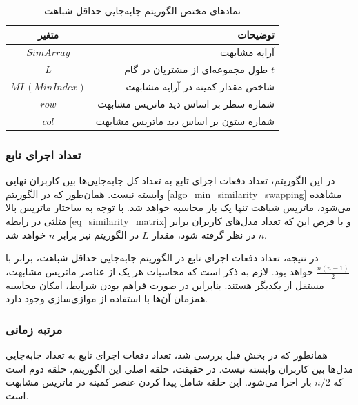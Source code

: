 \begin{table}[h]
	\centering
	\caption{نمادهای مختص الگوریتم جابه‌جایی حداقل شباهت}
	\label{tabel_MinSimilaritySwapNotations}
	\begin{tabular}{cr}
		\hline
		متغیر & توضیحات \\
		\hline
		$SimArray$ & آرایه مشابهت \\
		$L$ & طول مجموعه‌ای از مشتریان در گام $t$ \\
		$MI \, (MinIndex)$ & شاخص مقدار کمینه در آرایه مشابهت \\
		$row$ & شماره سطر بر اساس دید ماتریس مشابهت \\
		$col$ & شماره ستون بر اساس دید ماتریس مشابهت
	\end{tabular}
\end{table}





\vspace{3mm}
\subsubsection{
	تعداد اجرای تابع
}\vspace{-1mm}
در این الگوریتم، تعداد دفعات اجرای تابع
به تعداد کل جابه‌جایی‌ها بین کاربران نهایی وابسته نیست. همان‌طور که در الگوریتم
\ref{algo_min_similarity_swapping}
مشاهده می‌شود، ماتریس شباهت تنها یک بار محاسبه خواهد شد. با توجه به ساختار ماتریس بالا مثلثی در رابطه
\ref{eq_similarity_matrix}
و با فرض این که تعداد مدل‌های کاربران برابر \(n\) در نظر گرفته شود، مقدار \(L\) در الگوریتم نیز برابر \(n\) خواهد شد.

در نتیجه، تعداد دفعات اجرای تابع
در الگوریتم جابه‌جایی حداقل شباهت، برابر با \(\frac{n(n-1)}{2}\) خواهد بود. لازم به ذکر است که محاسبات هر یک از عناصر ماتریس مشابهت، مستقل از یکدیگر هستند. بنابراین در صورت فراهم بودن شرایط، امکان محاسبه همزمان آن‌ها با استفاده از موازی‌سازی وجود دارد.

\vspace{3mm}
\subsubsection{مرتبه زمانی}\vspace{-1mm}
همانطور که در بخش قبل بررسی شد، تعداد دفعات اجرای تابع
به تعداد جابه‌جایی‌ مدل‌ها بین کاربران وابسته نیست. در حقیقت، حلقه اصلی این الگوریتم، حلقه دوم است که \(n/2\) بار اجرا می‌شود. این حلقه شامل پیدا کردن عنصر کمینه در ماتریس مشابهت است. 

